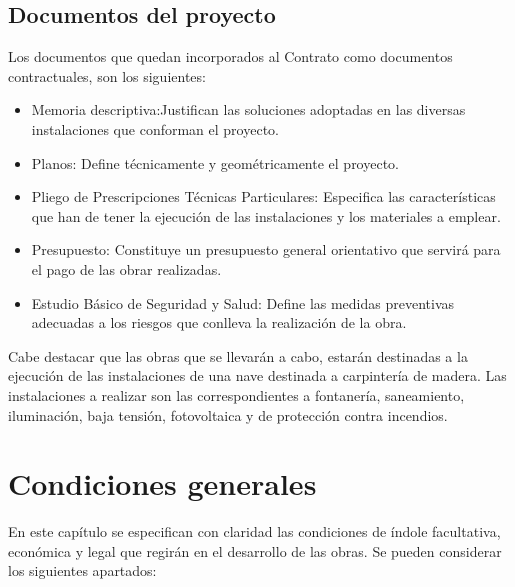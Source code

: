 \documentclass[../main.tex]{subfiles}
\begin{document}
\subsection{Documentos del proyecto}
Los documentos que quedan incorporados al Contrato como documentos contractuales, son los siguientes:
\begin{itemize}
    \item Memoria descriptiva:Justifican las soluciones adoptadas en las diversas instalaciones que conforman el proyecto.
    \item Planos: Define técnicamente y geométricamente el proyecto.
    \item Pliego de Prescripciones Técnicas Particulares: Especifica las características que han de tener la ejecución de las instalaciones y los materiales a emplear. 
    \item Presupuesto: Constituye un presupuesto general orientativo que servirá para el pago de las obrar realizadas.
    \item Estudio Básico de Seguridad y Salud: Define las medidas preventivas adecuadas a los riesgos que conlleva la realización de la obra.
\end{itemize}
Cabe destacar que las obras que se llevarán a cabo, estarán destinadas a la ejecución de las instalaciones de una nave destinada a carpintería de madera. Las instalaciones a realizar son las correspondientes a fontanería, saneamiento, iluminación, baja tensión, fotovoltaica y de protección contra incendios.

\section{Condiciones generales}
En este capítulo se especifican con claridad las condiciones de índole facultativa, económica y legal que regirán en el desarrollo de las obras. Se pueden considerar los siguientes apartados:
\end{document}
